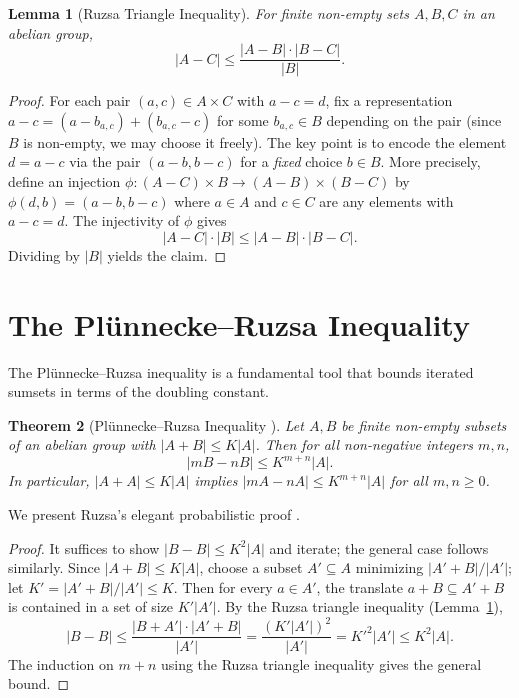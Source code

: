 \documentclass[12pt,a4paper]{amsart}
\newtheorem{theorem}{Theorem}[section]
\newtheorem{lemma}[theorem]{Lemma}
\theoremstyle{definition}
\theoremstyle{remark}
\begin{document}
\begin{lemma}[Ruzsa Triangle Inequality]\label{lem:ruzsa_triangle}
For finite non-empty sets $A, B, C$ in an abelian group,
\[
  |A - C| \leq \frac{|A - B| \cdot |B - C|}{|B|}.
\]
\end{lemma}

\begin{proof}
For each pair $(a, c) \in A \times C$ with $a - c = d$, fix a representation
$a - c = (a - b_{a,c}) + (b_{a,c} - c)$ for some $b_{a,c} \in B$ depending on
the pair (since $B$ is non-empty, we may choose it freely). The key point is to
encode the element $d = a - c$ via the pair $(a - b, b - c)$ for a \emph{fixed}
choice $b \in B$. More precisely, define an injection
$\phi: (A - C) \times B \to (A - B) \times (B - C)$ by $\phi(d, b) = (a - b, b - c)$
where $a \in A$ and $c \in C$ are any elements with $a - c = d$. The injectivity
of $\phi$ gives
\[
  |A - C| \cdot |B| \leq |A - B| \cdot |B - C|.
\]
Dividing by $|B|$ yields the claim. \end{proof}

\section{The Plünnecke--Ruzsa Inequality}\label{sec:plunnecke}

The Plünnecke--Ruzsa inequality is a fundamental tool that bounds iterated sumsets
in terms of the doubling constant.

\begin{theorem}[Plünnecke--Ruzsa Inequality \cite{Plunnecke1970,Ruzsa1989}]\label{thm:plunnecke}
Let $A, B$ be finite non-empty subsets of an abelian group with $|A + B| \leq K|A|$.
Then for all non-negative integers $m, n$,
\[
  |mB - nB| \leq K^{m+n} |A|.
\]
In particular, $|A + A| \leq K|A|$ implies $|mA - nA| \leq K^{m+n}|A|$ for all
$m, n \geq 0$.
\end{theorem}

We present Ruzsa's elegant probabilistic proof \cite{Ruzsa2009}.

\begin{proof}
It suffices to show $|B - B| \leq K^2 |A|$ and iterate; the general case follows
similarly. Since $|A + B| \leq K|A|$, choose a subset $A' \subseteq A$ minimizing
$|A' + B|/|A'|$; let $K' = |A' + B|/|A'| \leq K$. Then for every
$a \in A'$, the translate $a + B \subseteq A' + B$ is contained in a set of size
$K'|A'|$. By the Ruzsa triangle inequality (Lemma~\ref{lem:ruzsa_triangle}),
\[
  |B - B| \leq \frac{|B + A'| \cdot |A' + B|}{|A'|} = \frac{(K'|A'|)^2}{|A'|}
  = K'^2 |A'| \leq K^2 |A|.
\]
The induction on $m + n$ using the Ruzsa triangle inequality gives the general
bound.
\end{proof}
\end{document}
